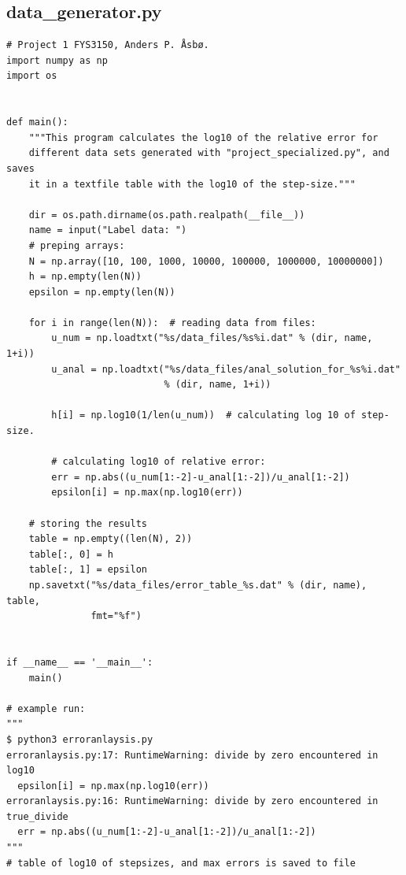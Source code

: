 \documentclass[english,notitlepage,reprint]{revtex4-1}  %
\begin{document}
\subsection{data\_generator.py} \label{A:3}
\begin{lstlisting}
# Project 1 FYS3150, Anders P. Åsbø.
import numpy as np
import os


def main():
    """This program calculates the log10 of the relative error for
    different data sets generated with "project_specialized.py", and saves
    it in a textfile table with the log10 of the step-size."""

    dir = os.path.dirname(os.path.realpath(__file__))
    name = input("Label data: ")
    # preping arrays:
    N = np.array([10, 100, 1000, 10000, 100000, 1000000, 10000000])
    h = np.empty(len(N))
    epsilon = np.empty(len(N))

    for i in range(len(N)):  # reading data from files:
        u_num = np.loadtxt("%s/data_files/%s%i.dat" % (dir, name, 1+i))
        u_anal = np.loadtxt("%s/data_files/anal_solution_for_%s%i.dat"
                            % (dir, name, 1+i))

        h[i] = np.log10(1/len(u_num))  # calculating log 10 of step-size.

        # calculating log10 of relative error:
        err = np.abs((u_num[1:-2]-u_anal[1:-2])/u_anal[1:-2])
        epsilon[i] = np.max(np.log10(err))

    # storing the results
    table = np.empty((len(N), 2))
    table[:, 0] = h
    table[:, 1] = epsilon
    np.savetxt("%s/data_files/error_table_%s.dat" % (dir, name), table,
               fmt="%f")


if __name__ == '__main__':
    main()

# example run:
"""
$ python3 erroranlaysis.py
erroranlaysis.py:17: RuntimeWarning: divide by zero encountered in log10
  epsilon[i] = np.max(np.log10(err))
erroranlaysis.py:16: RuntimeWarning: divide by zero encountered in true_divide
  err = np.abs((u_num[1:-2]-u_anal[1:-2])/u_anal[1:-2])
"""
# table of log10 of stepsizes, and max errors is saved to file

\end{lstlisting}
\end{document}
